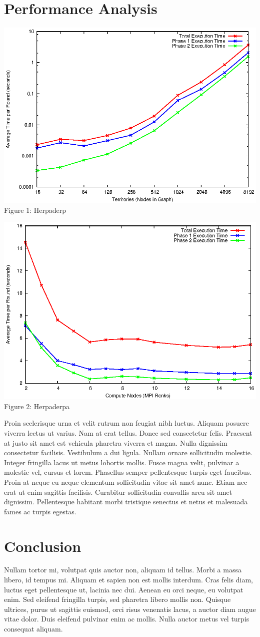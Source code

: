 \documentclass[10pt]{article}
\begin{document}
\begin{multicols}{2}
		\section*{Performance Analysis}
		
		\begin{center}
			\includegraphics[width=.45\textwidth]{graphs.eps}
			\small{Figure 1: Herpaderp}
		\end{center}
		
		\begin{center}
			\includegraphics[width=.45\textwidth]{ranks.eps}
			\small{Figure 2: Herpaderpa}
		\end{center}
		
		Proin scelerisque urna et velit rutrum non feugiat nibh luctus. Aliquam posuere viverra lectus ut varius. Nam at erat tellus. Donec sed consectetur felis. Praesent at justo sit amet est vehicula pharetra viverra et magna. Nulla dignissim consectetur facilisis. Vestibulum a dui ligula. Nullam ornare sollicitudin molestie. Integer fringilla lacus ut metus lobortis mollis. Fusce magna velit, pulvinar a molestie vel, cursus et lorem. Phasellus semper pellentesque turpis eget faucibus. Proin at neque eu neque elementum sollicitudin vitae sit amet nunc. Etiam nec erat ut enim sagittis facilisis. Curabitur sollicitudin convallis arcu sit amet dignissim. Pellentesque habitant morbi tristique senectus et netus et malesuada fames ac turpis egestas.
		



		
		\section*{Conclusion}
		Nullam tortor mi, volutpat quis auctor non, aliquam id tellus. Morbi a massa libero, id tempus mi. Aliquam et sapien non est mollis interdum. Cras felis diam, luctus eget pellentesque ut, lacinia nec dui. Aenean eu orci neque, eu volutpat enim. Sed eleifend fringilla turpis, sed pharetra libero mollis non. Quisque ultrices, purus ut sagittis euismod, orci risus venenatis lacus, a auctor diam augue vitae dolor. Duis eleifend pulvinar enim ac mollis. Nulla auctor metus vel turpis consequat aliquam.
		


\end{multicols}
\end{document}
